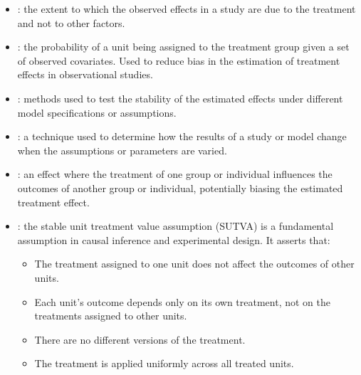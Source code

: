 \documentclass[letterpaper,10pt,english]{jupyterBook}
\begin{document}
\begin{itemize}
\item {} 
\sphinxAtStartPar
{}: the extent to which the observed effects in a study are due to the treatment and not to other factors.

\item {} 
\sphinxAtStartPar
{}: the probability of a unit being assigned to the treatment group given a set of observed covariates. Used to reduce bias in the estimation of treatment effects in observational studies.

\item {} 
\sphinxAtStartPar
{}: methods used to test the stability of the estimated effects under different model specifications or assumptions.

\item {} 
\sphinxAtStartPar
{}: a technique used to determine how the results of a study or model change when the assumptions or parameters are varied.

\item {} 
\sphinxAtStartPar
{}: an effect where the treatment of one group or individual influences the outcomes of another group or individual, potentially biasing the estimated treatment effect.

\item {} 
\sphinxAtStartPar
{}: the stable unit treatment value assumption (SUTVA) is a fundamental assumption in causal inference and experimental design. It asserts that:
\begin{itemize}
\item {} 
\sphinxAtStartPar
The treatment assigned to one unit does not affect the outcomes of other units.

\item {} 
\sphinxAtStartPar
Each unit’s outcome depends only on its own treatment, not on the treatments assigned to other units.

\item {} 
\sphinxAtStartPar
There are no different versions of the treatment.

\item {} 
\sphinxAtStartPar
The treatment is applied uniformly across all treated units.

\end{itemize}

\end{itemize}
\end{document}
